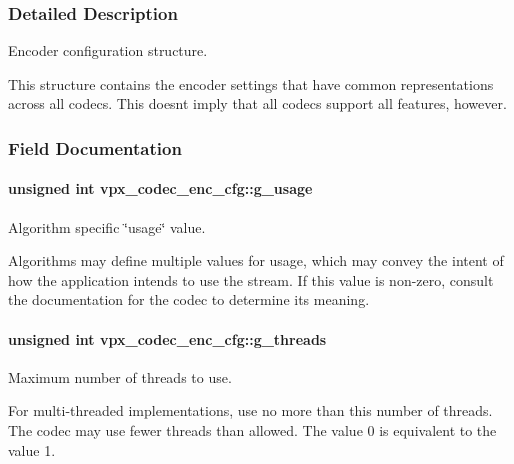\subsubsection{Detailed Description}
Encoder configuration structure. 

This structure contains the encoder settings that have common representations across all codecs. This doesn\textquotesingle{}t imply that all codecs support all features, however. 

\subsubsection{Field Documentation}
\paragraph[{\texorpdfstring{g\+\_\+usage}{g_usage}}]{\setlength{\rightskip}{0pt plus 5cm}unsigned int vpx\+\_\+codec\+\_\+enc\+\_\+cfg\+::g\+\_\+usage}\hypertarget{structvpx__codec__enc__cfg_a5bcf7fc1efc4890de351e3c6fe252355}{}\label{structvpx__codec__enc__cfg_a5bcf7fc1efc4890de351e3c6fe252355}


Algorithm specific \char`\"{}usage\char`\"{} value. 

Algorithms may define multiple values for usage, which may convey the intent of how the application intends to use the stream. If this value is non-\/zero, consult the documentation for the codec to determine its meaning. 
\paragraph[{\texorpdfstring{g\+\_\+threads}{g_threads}}]{\setlength{\rightskip}{0pt plus 5cm}unsigned int vpx\+\_\+codec\+\_\+enc\+\_\+cfg\+::g\+\_\+threads}\hypertarget{structvpx__codec__enc__cfg_aff9d8d458c45c95dd542603210ba2b8b}{}\label{structvpx__codec__enc__cfg_aff9d8d458c45c95dd542603210ba2b8b}


Maximum number of threads to use. 

For multi-\/threaded implementations, use no more than this number of threads. The codec may use fewer threads than allowed. The value 0 is equivalent to the value 1. 
